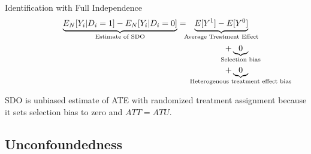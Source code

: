 \documentclass{beamer}
\begin{document}
\begin{frame}[plain]

  \begin{block}{Identification with Full Independence}
    \begin{eqnarray*}
      \underbrace{E_N[Y_i | D_i=1] - E_N[Y_i | D_i=0]}_{ \mathclap{\text{Estimate of SDO}}}&=& \underbrace{E[Y^1] - E[Y^0]}_{ \mathclap{\text{Average Treatment Effect}}} \\
    &&+ \underbrace{0}_{ \mathclap{\text{Selection bias}}}  \\
    && + \underbrace{0}_{ \mathclap{\text{Heterogenous treatment effect bias}}}
    \end{eqnarray*}
  \end{block}
  
  SDO is unbiased estimate of ATE with randomized treatment assignment because it sets selection bias to zero and $ATT=ATU$.



\end{frame}


\subsection{Unconfoundedness}
\end{document}
